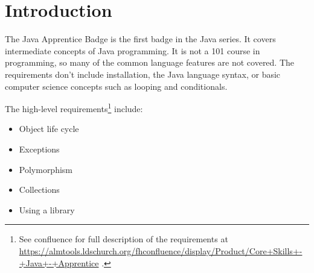 \section*{Introduction} %


The Java Apprentice Badge is the first badge in the Java series. It covers intermediate concepts of Java programming. It is not a 101 course in programming, so many of the common language features are not covered. The requirements don't include installation, the Java language syntax, or basic computer science concepts such as looping and conditionals.

The high-level requirements\footnote{See confluence for full description of the requirements at \url{https://almtools.ldschurch.org/fhconfluence/display/Product/Core+Skills+-+Java+-+Apprentice} .} include:
\begin{itemize}
\item Object life cycle
\item Exceptions
\item Polymorphism
\item Collections
\item Using a library
\end{itemize}
